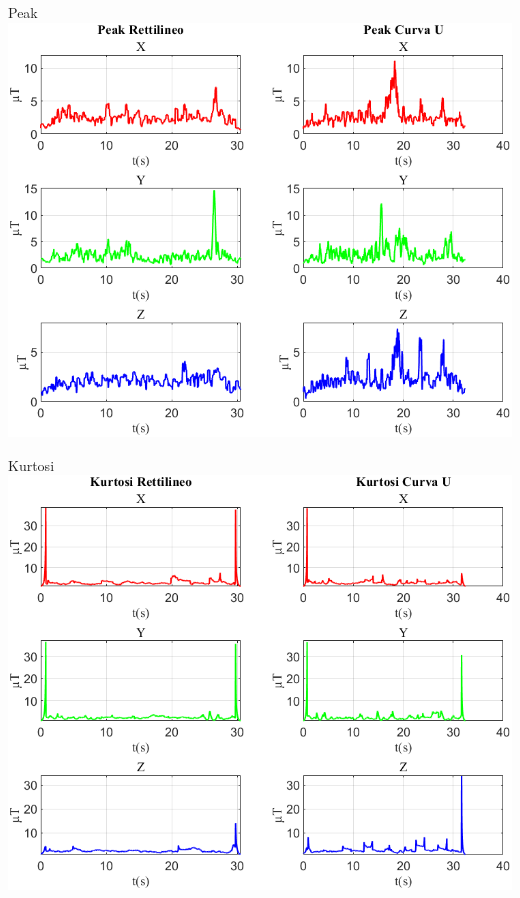 \documentclass[beamer]{standalone}
\begin{document}
	\begin{frame}{{Peak}}
		\centering\includegraphics[height=.8\textheight]{figure/Mag/Peak}
	\end{frame}
	
	\begin{frame}{{Kurtosi}}
		\centering\includegraphics[height=.8\textheight]{figure/Mag/Kurtosi}
	\end{frame}
	
\end{document}
